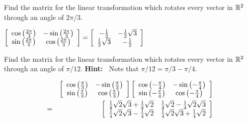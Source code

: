 \begin{enumialphparenastyle}
\begin{ex} Find the matrix for the linear transformation which rotates every
vector in $\mathbb{R}^{2}$ through an angle of $2\pi /3.$
\begin{sol}
$\left[
\begin{array}{cc}
\cos \left( \frac{2\pi }{3}\right) & -\sin \left( \frac{2\pi }{3}\right) \\
\sin \left( \frac{2\pi }{3}\right) & \cos \left( \frac{2\pi }{3}\right)
\end{array}
\right] = \left[
\begin{array}{cc}
-\frac{1}{2} & -\frac{1}{2}\sqrt{3} \\
\frac{1}{2}\sqrt{3} & -\frac{1}{2}
\end{array}
\right] $
\end{sol}
\end{ex}

\begin{ex} Find the matrix for the linear transformation which rotates every
vector in $\mathbb{R}^{2}$ through an angle of $\pi /12.$ \textbf{Hint:\ }
Note that $\pi /12=\pi /3-\pi /4.$
\begin{sol}
\begin{eqnarray*}
&&\left[
\begin{array}{cc}
\cos \left( \frac{\pi }{3}\right)  & -\sin \left( \frac{\pi }{3}\right)  \\
\sin \left( \frac{\pi }{3}\right)  & \cos \left( \frac{\pi }{3}\right)
\end{array}
\right] \left[
\begin{array}{cc}
\cos \left( -\frac{\pi }{4}\right)  & -\sin \left( -\frac{\pi }{4}\right)
\\
\sin \left( -\frac{\pi }{4}\right)  & \cos \left( -\frac{\pi }{4}\right)
\end{array}
\right]  \\
&=&\left[
\begin{array}{cc}
\frac{1}{4}\sqrt{2}\sqrt{3}+\frac{1}{4}\sqrt{2} & \frac{1}{4}\sqrt{2}-\frac{1
}{4}\sqrt{2}\sqrt{3} \\
\frac{1}{4}\sqrt{2}\sqrt{3}-\frac{1}{4}\sqrt{2} & \frac{1}{4}\sqrt{2}\sqrt{3}
+\frac{1}{4}\sqrt{2}
\end{array}
\right]
\end{eqnarray*}
\end{sol}
\end{ex}


\end{enumialphparenastyle}
